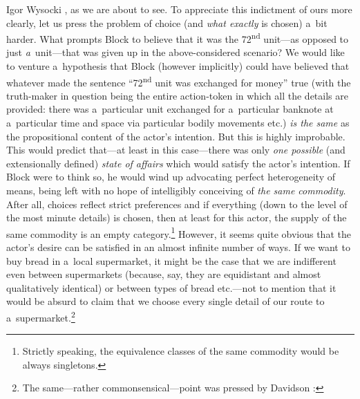 \begin{artengenv}{Igor Wysocki}
{%
\parencite*[][]{hoppe_must_2005}, %
 as we are about to see.} To appreciate this indictment of ours more clearly, let us press the problem of choice (and \textit{what exactly} is chosen) a~bit harder. What prompts Block to believe that it was the 72\textsuperscript{nd} unit---as opposed to just \textit{a}~unit---that was given up in the above-considered scenario? We would like to venture a~hypothesis that Block (however implicitly) could have believed that whatever made the sentence ``72\textsuperscript{nd} unit was exchanged for money'' true (with the truth-maker in question being the entire action-token in which all the details are provided: there was a~particular unit exchanged for a~particular banknote at a~particular time and space via particular bodily movements etc.) \textit{is the same} as the propositional content of the actor's intention. But this is highly improbable. This would predict that---at least in this case---there was only \textit{one possible} (and extensionally defined) \textit{state of affairs} which would satisfy the actor's intention. If Block were to think so, he would wind up advocating perfect heterogeneity of means, being left with no hope of intelligibly conceiving of \textit{the same commodity}. After all, choices reflect strict preferences and if everything (down to the level of the most minute details) is chosen, then at least for this actor, the supply of the same commodity is an empty category.\footnote{Strictly speaking, the equivalence classes of the same commodity would be always singletons.} However, it seems quite obvious that the actor's desire can be satisfied in an almost infinite number of ways. If we want to buy bread in a~local supermarket, it might be the case that we are indifferent even between supermarkets (because, say, they are equidistant and almost qualitatively identical) or between types of bread etc.---not to mention that it would be absurd to claim that we choose every single detail of our route to a~supermarket.\footnote{The same---rather commonsensical---point was pressed by Davidson 
\parencite*[][p.688]{davidson_actions_1963}: %
}
\end{artengenv}

